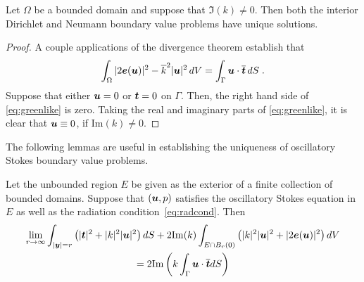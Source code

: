 \begin{thrm}
  Let $\Omega$ be a bounded domain and suppose that
  $\Im (k) \neq 0$. Then both the interior
  Dirichlet and Neumann boundary value problems have
  unique solutions.
\end{thrm}
\begin{proof}
  A couple applications of the divergence theorem establish
  that
  \begin{equation} \label{eq:greenlike}
    \int_\Omega |2{\boldsymbol e}({\boldsymbol u})|^2 - \overline{k}^2 |{\boldsymbol u}|^2 \, dV
    = \int_\Gamma {\boldsymbol u} \cdot \overline{{\boldsymbol t}} \, dS \; . 
  \end{equation}
  Suppose that either ${\boldsymbol u} = 0$ or ${\boldsymbol t} = 0$ on $\Gamma$.
  Then, the right hand side of \cref{eq:greenlike} is
  zero. 
  Taking the real and imaginary parts of \cref{eq:greenlike},
  it is clear that ${\boldsymbol u} \equiv 0$, if $\text{Im}(k) \neq 0$.
\end{proof}

The following lemmas are useful in establishing the uniqueness
of oscillatory Stokes boundary value problems.

\begin{lem}
  \label{lem:rep}
  Let the unbounded region $E$ be given as the exterior
  of a finite collection of bounded domains.
  Suppose that $({\boldsymbol u},p)$ satisfies the oscillatory Stokes equation in 
  $E$ as well as the radiation condition~\cref{eq:radcond}. 
Then 
\begin{multline}
\label{eq:repinfest}  
\lim_{r\to\infty}
\int_{|{\boldsymbol y}|=r} \left( |{\boldsymbol t}|^2 + |k|^2 |{\boldsymbol u}|^2 \right) dS +
2 {\textrm{\textup{Im}}}(k) \int_{E \cap B_{r}(0)} \left(|k|^2 |{\boldsymbol u}|^2 + |2{\boldsymbol e}({\boldsymbol u})|^2 \right)
dV \\
= 2 {\textrm{\textup{Im}}} \left( k \int_{\Gamma} {\boldsymbol u} \cdot
\overline{{\boldsymbol t}} dS  \right) 
\end{multline}

\end{lem}

